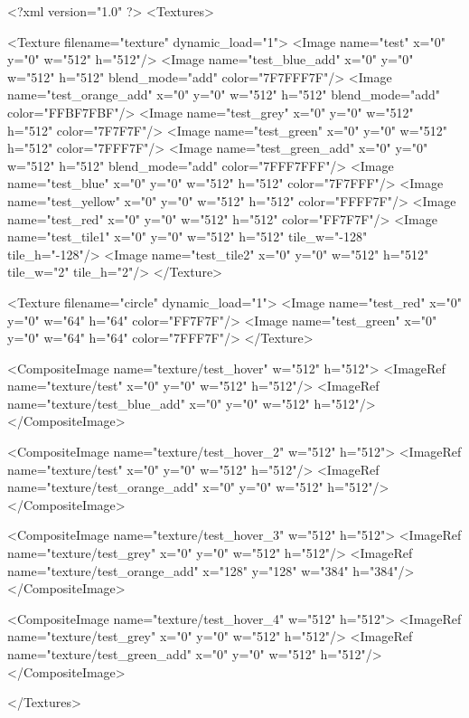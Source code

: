 <?xml version="1.0" ?>
<Textures>

	<Texture filename="texture" dynamic_load="1">
		<Image name="test" x="0" y="0" w="512" h="512"/>
		<Image name="test_blue_add" x="0" y="0" w="512" h="512" blend_mode="add" color="7F7FFF7F"/>
		<Image name="test_orange_add" x="0" y="0" w="512" h="512" blend_mode="add" color="FFBF7FBF"/>
		<Image name="test_grey" x="0" y="0" w="512" h="512" color="7F7F7F"/>
		<Image name="test_green" x="0" y="0" w="512" h="512" color="7FFF7F"/>
		<Image name="test_green_add" x="0" y="0" w="512" h="512" blend_mode="add" color="7FFF7FFF"/>
		<Image name="test_blue" x="0" y="0" w="512" h="512" color="7F7FFF"/>
		<Image name="test_yellow" x="0" y="0" w="512" h="512" color="FFFF7F"/>
		<Image name="test_red" x="0" y="0" w="512" h="512" color="FF7F7F"/>
		<Image name="test_tile1" x="0" y="0" w="512" h="512" tile_w="-128" tile_h="-128"/>
		<Image name="test_tile2" x="0" y="0" w="512" h="512" tile_w="2" tile_h="2"/>
	</Texture>
	
	<Texture filename="circle" dynamic_load="1">
		<Image name="test_red" x="0" y="0" w="64" h="64" color="FF7F7F"/>
		<Image name="test_green" x="0" y="0" w="64" h="64" color="7FFF7F"/>
	</Texture>
	
	<CompositeImage name="texture/test_hover" w="512" h="512">
		<ImageRef name="texture/test" x="0" y="0" w="512" h="512"/>
		<ImageRef name="texture/test_blue_add" x="0" y="0" w="512" h="512"/>
	</CompositeImage>
	
	<CompositeImage name="texture/test_hover_2" w="512" h="512">
		<ImageRef name="texture/test" x="0" y="0" w="512" h="512"/>
		<ImageRef name="texture/test_orange_add" x="0" y="0" w="512" h="512"/>
	</CompositeImage>
	
	<CompositeImage name="texture/test_hover_3" w="512" h="512">
		<ImageRef name="texture/test_grey" x="0" y="0" w="512" h="512"/>
		<ImageRef name="texture/test_orange_add" x="128" y="128" w="384" h="384"/>
	</CompositeImage>
	
	<CompositeImage name="texture/test_hover_4" w="512" h="512">
		<ImageRef name="texture/test_grey" x="0" y="0" w="512" h="512"/>
		<ImageRef name="texture/test_green_add" x="0" y="0" w="512" h="512"/>
	</CompositeImage>
	
</Textures>
